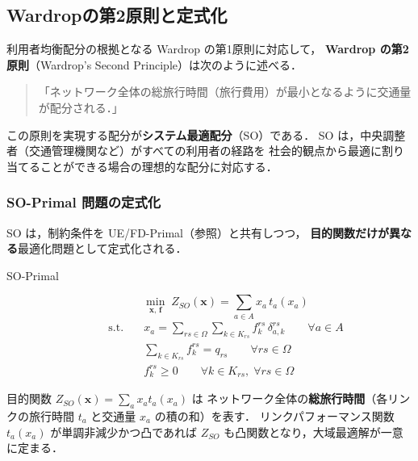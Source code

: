 \subsection{Wardropの第2原則と定式化}
\label{subsec:wardrop2}

利用者均衡配分の根拠となる Wardrop の第1原則に対応して，
\textbf{Wardrop の第2原則}（Wardrop's Second Principle）は次のように述べる\cite{Wardrop1952}．

\begin{quotation}
  \noindent
  「ネットワーク全体の総旅行時間（旅行費用）が最小となるように交通量が配分される．」
\end{quotation}

この原則を実現する配分が\textbf{システム最適配分}（SO）である．
SO は，中央調整者（交通管理機関など）がすべての利用者の経路を
社会的観点から最適に割り当てることができる場合の理想的な配分に対応する．

\subsubsection*{SO-Primal 問題の定式化}

SO は，制約条件を UE/FD-Primal（参照）と共有しつつ，
\textbf{目的関数だけが異なる}最適化問題として定式化される\cite{Beckmann1956}．

\begin{description}
  \item[SO-Primal]
    \begin{equation}
      \min_{\boldsymbol{x},\,\boldsymbol{f}}\;
      Z_{SO}(\boldsymbol{x})
      = \sum_{a \in A} x_a\, t_a(x_a)
      \label{eq:so-primal}
    \end{equation}
    \begin{align*}
      \text{s.t.} \quad
      & x_a = \sum_{rs \in \Omega}\sum_{k \in K_{rs}} f_k^{rs}\,\delta_{a,k}^{rs}
        \qquad \forall a \in A \\
      & \sum_{k \in K_{rs}} f_k^{rs} = q_{rs}
        \qquad \forall rs \in \Omega \\
      & f_k^{rs} \geq 0
        \qquad \forall k \in K_{rs},\; \forall rs \in \Omega
    \end{align*}
\end{description}

目的関数 $Z_{SO}(\boldsymbol{x}) = \sum_{a} x_a t_a(x_a)$ は
ネットワーク全体の\textbf{総旅行時間}（各リンクの旅行時間 $t_a$ と交通量 $x_a$ の積の和）を表す．
リンクパフォーマンス関数 $t_a(x_a)$ が単調非減少かつ凸であれば
$Z_{SO}$ も凸関数となり，大域最適解が一意に定まる．

